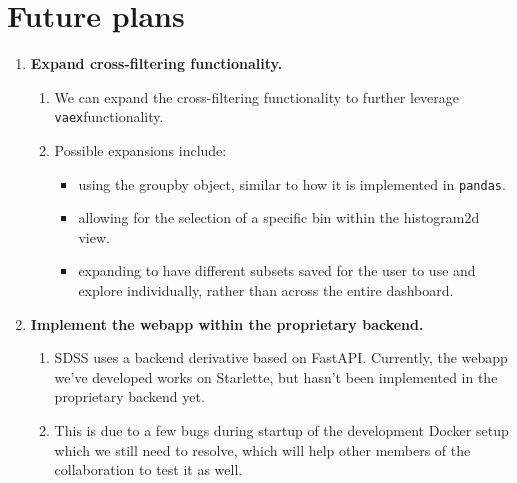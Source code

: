 \documentclass[a4paper,10pt,twocolumn]{article}
\newcommand{\vaex}{\texttt{vaex}}
\begin{document}
\section{Future plans}
\begin{enumerate}
	\item \textbf{Expand cross-filtering functionality.}
	      \begin{enumerate}
		      \item We can expand the cross-filtering functionality to further leverage \vaex functionality.
		      \item Possible expansions include:
		            \begin{itemize}
			            \item using the groupby object, similar to how it is implemented in \texttt{pandas}.
			            \item allowing for the selection of a specific bin within the histogram2d view.
			            \item expanding to have different subsets saved for the user to use and explore individually, rather than across the entire dashboard.
		            \end{itemize}
	      \end{enumerate}
	\item \textbf{Implement the webapp within the proprietary backend.}
	      \begin{enumerate}
		      \item SDSS uses a backend derivative based on FastAPI. Currently, the webapp we've developed works on Starlette, but hasn't been implemented in the proprietary backend yet.
		      \item This is due to a few bugs during startup of the development Docker setup which we still need to resolve, which will help other members of the collaboration to test it as well.
	      \end{enumerate}
\end{enumerate}
\printbibliography
\end{document}
